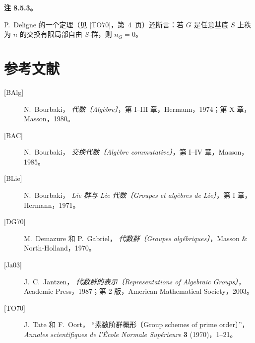 \medskip
\noindent\textbf{注 8.5.3。}
\label{sga3:VIIA:8.5.3}

P.~Deligne 的一个定理（见 \textup{[TO70]}，第~4~页）还断言：若 \(G\) 是任意基底 \(S\) 上秩为 \(n\) 的交换有限局部自由 \(S\)-群，则 \(n_G=0\)。

\chapter*{参考文献}
\label{sga3:VIIA:bibliography}

\begin{description}
  \item[\textup{[BAlg]}] N.~Bourbaki，
  \emph{代数〔Alg\`ebre〕}，第 I--III 章，Hermann，1974；第 X 章，Masson，1980。

  \item[\textup{[BAC]}] N.~Bourbaki，
  \emph{交换代数〔Alg\`ebre commutative〕}，第 I--IV 章，Masson，1985。

  \item[\textup{[BLie]}] N.~Bourbaki，
  \emph{Lie 群与 Lie 代数〔Groupes et alg\`ebres de Lie〕}，第 I 章，Hermann，1971。

  \item[\textup{[DG70]}] M.~Demazure 和 P.~Gabriel，
  \emph{代数群〔Groupes alg\'ebriques〕}，Masson \& North-Holland，1970。

  \item[\textup{[Ja03]}] J.~C.~Jantzen，
  \emph{代数群的表示〔Representations of Algebraic Groups〕}，Academic Press，1987；第 2 版，American Mathematical Society，2003。

  \item[\textup{[TO70]}] J.~Tate 和 F.~Oort，
  “素数阶群概形〔Group schemes of prime order〕”，
  \emph{Annales scientifiques de l'\'Ecole Normale Sup\'erieure} \textbf{3} (1970)，1--21。
\end{description}

